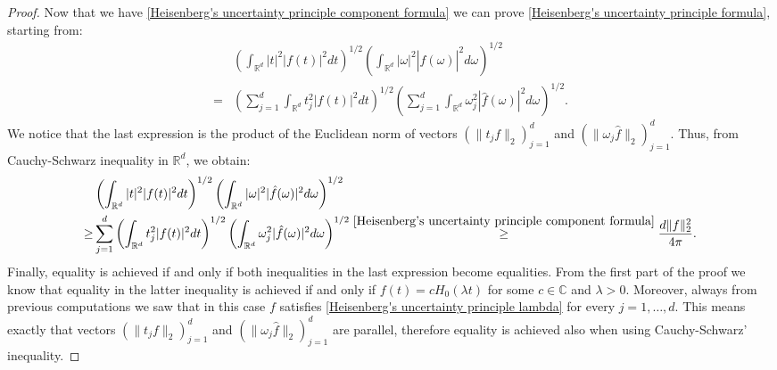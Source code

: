 \documentclass[corpo=11pt, stile=classica, tipotesi=custom,
greek, evenboxes, english]{toptesi}
\numberwithin{equation}{chapter}
\theoremstyle{definition}
\theoremstyle{remark}
\newcommand{\R}{\mathbb{R}} %
\newcommand{\C}{\mathbb{C}} %
\begin{document}
\begin{proof}
	Now that we have \eqref{Heisenberg's uncertainty principle component formula} we can prove \eqref{Heisenberg's uncertainty principle formula}, starting from:
	\begin{align*}
		&\left( \int_{\R^d} |t|^2 |f(t)|^2dt \right)^{1/2} \left( \int_{\R^d} |\omega|^2 |\hat{f}(\omega)|^2 d\omega \right)^{1/2} \\
		=&\left( \sum_{j=1}^d \int_{\R^d} t_j^2 |f(t)|^2dt \right)^{1/2} \left( \sum_{j=1}^d \int_{\R^d} \omega_j^2 |\hat{f}(\omega)|^2 d\omega \right)^{1/2}.
	\end{align*}
	We notice that the last expression is the product of the Euclidean norm of vectors $( \| t_j f \|_2 )_{j=1}^d$ and $( \| \omega_j \hat{f} \|_2)_{j=1}^d$. Thus, from Cauchy-Schwarz inequality in $\R^d$, we obtain:
	\begin{align*}
		&\left( \int_{\R^d} |t|^2 |f(t)|^2dt \right)^{1/2} \left( \int_{\R^d} |\omega|^2 |\hat{f}(\omega)|^2 d\omega \right)^{1/2} \\
		\geq &\sum_{j=1}^d \left( \int_{\R^d} t_j^2 |f(t)|^2dt \right)^{1/2} \left( \int_{\R^d} \omega_j^2 |\hat{f}(\omega)|^2 d\omega \right)^{1/2} \overset{\eqref{Heisenberg's uncertainty principle component formula}}{\geq} \dfrac{d \|f\|_2^2}{4 \pi}.
	\end{align*}
	Finally, equality is achieved if and only if both inequalities in the last expression become equalities. From the first part of the proof we know that equality in the latter inequality is achieved if and only if $f(t) = c H_0(\lambda t)$ for some $c \in \C$ and $\lambda > 0$. Moreover, always from previous computations we saw that in this case $f$ satisfies \eqref{Heisenberg's uncertainty principle lambda} for every $j=1,\ldots,d$. This means exactly that vectors $(\|t_j f\|_2)_{j=1}^d$ and $(\|\omega_j \hat{f}\|_2)_{j=1}^d$ are parallel, therefore equality is achieved also when using Cauchy-Schwarz' inequality.
\end{proof}
\end{document}
